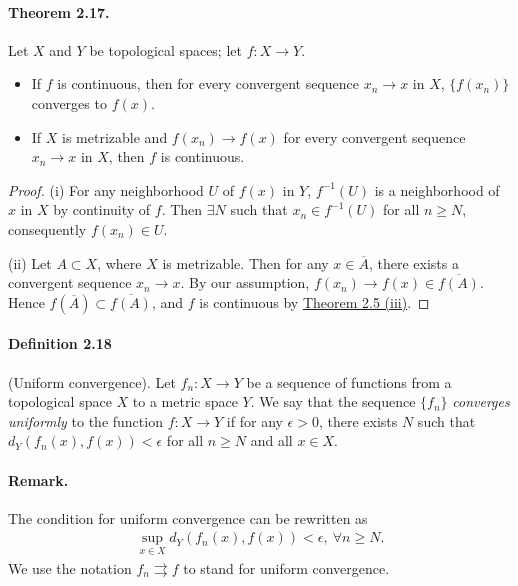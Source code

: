 \documentclass{article}
\numberwithin{equation}{section}
\theoremstyle{plain}
\theoremstyle{definition}
\begin{document}
\paragraph{Theorem 2.17.\label{thm:2.17}} Let $X$ and $Y$ be topological spaces; let $f:X\to Y$.
\begin{itemize}
	\item[(i)] If $f$ is continuous, then for every convergent sequence $x_n\to x$ in $X$, $\{f(x_n)\}$ converges to $f(x)$.
	\item[(ii)] If $X$ is metrizable and $f(x_n)\to f(x)$ for every convergent sequence $x_n\to x$ in $X$, then $f$ is continuous.
\end{itemize}
\begin{proof}
(i) For any neighborhood $U$ of $f(x)$ in $Y$, $f^{-1}(U)$ is a neighborhood of $x$ in $X$ by continuity of $f$. Then $\exists N$ such that $x_n\in f^{-1}(U)$ for all $n\geq N$, consequently $f(x_n)\in U$.

(ii) Let $A\subset X$, where $X$ is metrizable. Then for any $x\in\overline{A}$, there exists a convergent sequence $x_n\to x$. By our assumption, $f(x_n)\to f(x)\in\overline{f(A)}$. Hence $f(\overline{A})\subset \overline{f(A)}$, and $f$ is continuous by \hyperref[thm:2.5]{Theorem 2.5 (iii)}.
\end{proof}

\paragraph{Definition 2.18\label{def:2.18}} (Uniform convergence). Let $f_n:X\to Y$ be a sequence of functions from a topological space $X$ to a metric space $Y$. We say that the sequence $\{f_n\}$ \textit{converges uniformly} to the function $f:X\to Y$ if for any $\epsilon > 0$, there exists $N$ such that $d_Y(f_n(x),f(x))<\epsilon$ for all $n\geq N$ and all $x\in X$.

\paragraph{Remark.} The condition for uniform convergence can be rewritten as
\begin{align*}
	\sup_{x\in X} d_Y\left(f_n(x),f(x)\right) < \epsilon,\ \forall n\geq N.
\end{align*}
We use the notation $f_n\rightrightarrows f$ to stand for uniform convergence.
\end{document}
